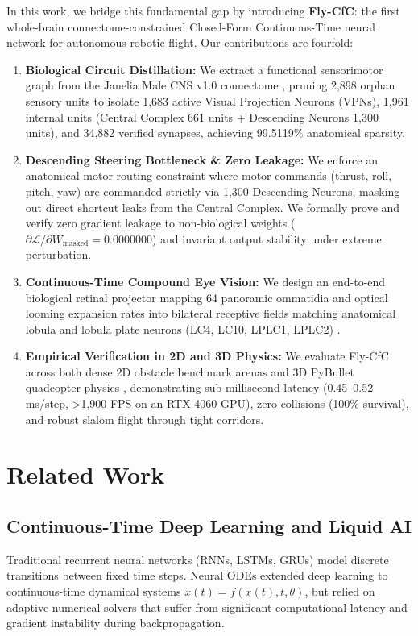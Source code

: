 \documentclass{article}
\begin{document}
In this work, we bridge this fundamental gap by introducing \textbf{Fly-CfC}: the first whole-brain connectome-constrained Closed-Form Continuous-Time neural network for autonomous robotic flight. Our contributions are fourfold:
\begin{enumerate}
    \item \textbf{Biological Circuit Distillation:} We extract a functional sensorimotor graph from the Janelia Male CNS v1.0 connectome \cite{berg2026sexual, takemura2023connectome}, pruning 2,898 orphan sensory units to isolate 1,683 active Visual Projection Neurons (VPNs), 1,961 internal units (Central Complex 661 units + Descending Neurons 1,300 units), and 34,882 verified synapses, achieving 99.5119\% anatomical sparsity.
    \item \textbf{Descending Steering Bottleneck \& Zero Leakage:} We enforce an anatomical motor routing constraint where motor commands (thrust, roll, pitch, yaw) are commanded strictly via 1,300 Descending Neurons, masking out direct shortcut leaks from the Central Complex. We formally prove and verify zero gradient leakage to non-biological weights ($\partial \mathcal{L} / \partial W_{\text{masked}} = 0.0000000$) and invariant output stability under extreme perturbation.
    \item \textbf{Continuous-Time Compound Eye Vision:} We design an end-to-end biological retinal projector mapping 64 panoramic ommatidia and optical looming expansion rates into bilateral receptive fields matching anatomical lobula and lobula plate neurons (LC4, LC10, LPLC1, LPLC2) \cite{klapoetke2017ultra}.
    \item \textbf{Empirical Verification in 2D and 3D Physics:} We evaluate Fly-CfC across both dense 2D obstacle benchmark arenas and 3D PyBullet quadcopter physics \cite{pan2023pybulletdrones}, demonstrating sub-millisecond latency (0.45--0.52 ms/step, >1,900 FPS on an RTX 4060 GPU), zero collisions (100\% survival), and robust slalom flight through tight corridors.
\end{enumerate}

\section{Related Work}

\subsection{Continuous-Time Deep Learning and Liquid AI}
Traditional recurrent neural networks (RNNs, LSTMs, GRUs) model discrete transitions between fixed time steps. Neural ODEs \cite{chen2018neural} extended deep learning to continuous-time dynamical systems $\dot{x}(t) = f(x(t), t, \theta)$, but relied on adaptive numerical solvers that suffer from significant computational latency and gradient instability during backpropagation.
\end{document}
